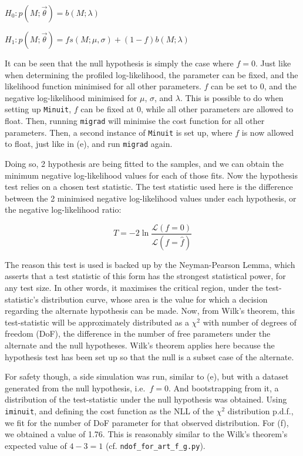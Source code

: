 \documentclass[12pt]{report} %
\begin{document}
\begin{center}
    $H_{0}: p(M;\vec{\theta}) = b(M;\lambda)$  

    \vspace*{1\baselineskip}  
    $H_{1}: p(M;\vec{\theta}) = fs(M;\mu,\sigma) + (1 - f)b(M;\lambda)$
\end{center}

It can be seen that the null hypothesis is simply the case where $f=0$. Just like when determining the profiled log-likelihood, the parameter can be fixed, and the likelihood function minimised for all other parameters. $f$ can be set to 0, and the negative log-likelihood minimised for $\mu$, $\sigma$, and $\lambda$. This is possible to do when setting up \texttt{Minuit}, $f$ can be fixed at 0, while all other parameters are allowed to float. Then, running \texttt{migrad} will minimise the cost function for all other parameters. Then, a second instance of \texttt{Minuit} is set up, where $f$ is now allowed to float, just like in (e), and run \texttt{migrad} again.  

Doing so, 2 hypothesis are being fitted to the samples, and we can obtain the minimum negative log-likelihood values for each of those fits. Now the hypothesis test relies on a chosen test statistic. The test statistic used here is the difference between the 2 minimised negative log-likelihood values under each hypothesis, or the negative log-likelihood ratio:

\begin{equation}
    T = -2 \ln{\frac{\mathcal{L}(f = 0)}{\mathcal{L}(f = \hat{f})}}
\end{equation}

The reason this test is used is backed up by the Neyman-Pearson Lemma, which asserts that a test statistic of this form has the strongest statistical power, for any test size. In other words, it maximises the critical region, under the test-statistic's distribution curve, whose area is the value for which a decision regarding the alternate hypothesis can be made. Now, from Wilk's theorem, this test-statistic will be approximately distributed as a $\chi^{2}$ with number of degrees of freedom (DoF), the difference in the number of free parameters under the alternate and the null hypotheses. Wilk's theorem applies here because the hypothesis test has been set up so that the null is a subset case of the alternate.  

For safety though, a side simulation was run, similar to (e), but with a dataset generated from the null hypothesis, i.e.\ $f=0$. And bootstrapping from it, a distribution of the test-statistic under the null hypothesis was obtained. Using \texttt{iminuit}, and defining the cost function as the NLL of the $\chi^{2}$ distribution p.d.f., we fit for the number of DoF parameter for that observed distribution. For (f), we obtained a value of 1.76. This is reasonably similar to the Wilk's theorem's expected value of $4 - 3 = 1$ (cf. \texttt{ndof\_for\_art\_f\_g.py}).  
\end{document}

